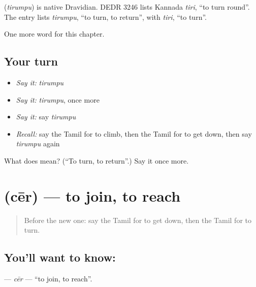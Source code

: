 \begin{cousinweb}
\textbf{} (\emph{tirumpu}) is native Dravidian. DEDR 3246 lists Kannada \emph{tiri}, \textquotedblleft{}to turn round\textquotedblright{}. The entry lists \emph{tirumpu}, \textquotedblleft{}to turn, to return\textquotedblright{}, with \emph{tiri}, \textquotedblleft{}to turn\textquotedblright{}.
\end{cousinweb}

\begin{grammarlens}[title={What you've built}]
One more word for this chapter.
\end{grammarlens}

\subsection*{Your turn}
\begin{itemize}
\raggedright
  \item \emph{Say it:} \emph{tirumpu}
  \item \emph{Say it:} \emph{tirumpu}, once more
  \item \emph{Say it:} say \emph{tirumpu}
  \item \emph{Recall:} say the Tamil for to climb, then the Tamil for to get down, then say \emph{tirumpu} again
\end{itemize}

\begin{tcolorbox}[breakable,colback=teal!4,colframe=teal!35!black,title={Before you move on}]
What does  mean? (\textquotedblleft{}To turn, to return\textquotedblright{}.) Say it once more.
\end{tcolorbox}
\section[\texorpdfstring{\ta{சேர்} (cēr)}{சேர் (cēr)}]{ (cēr) — to join, to reach}

\label{lesson:TA-C153-cer}



\begin{quote}
Before the new one: say the Tamil for to get down, then the Tamil for to turn.
\end{quote}

\subsection*{You'll want to know: }
\textbf{} — \emph{cēr} — \textquotedblleft{}to join, to reach\textquotedblright{}.

